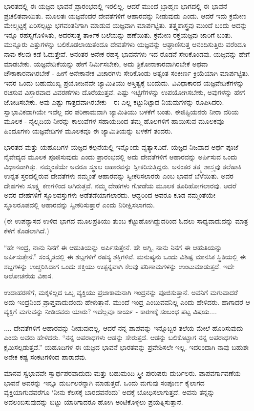 ಭಾರತದಲ್ಲಿ ಈ ಯಜ್ಞದ ಭಾವನೆ ಪ್ರಾರಂಭದಲ್ಲಿ ಇರಲಿಲ್ಲ. ಆದರೆ ಮುಂದೆ ಬ್ರಾಹ್ಮಣ ಭಾಗದಲ್ಲಿ ಈ ಭಾವನೆ ಪ್ರಚಲಿತವಾಯಿತು. ಮೂಲತಃ ಯಜ್ಞವೆಂದರೆ ದೇವತೆಗಳಿಗೆ ಆಹಾರವನ್ನು ನೀಡುವುದು ಎಂದು. ಆದರೆ ಇದು ಕ್ರಮೇಣ ಮೇಲ್ಮಟ್ಟಕ್ಕೆ ಏರಿಸಲ್ಪಟ್ಟು ಭಗವಂತನಿಗಾಗಿ ಮಾಡುವ ಯಜ್ಞವಾಗಿ ಮಾರ್ಪಟ್ಟಿತು. ತತ್ತ್ವಶಾಸ್ತ್ರವು ಮುಂದೆ ಬಂದು ಅದನ್ನು ಇನ್ನೂ ರಹಸ್ಯಗೊಳಿಸಿತು, ಅದರಸುತ್ತ ತಾರ್ಕಿಕ ಬಲೆಯನ್ನು ಹಣೆಯಿತು. ಕ್ರಮೇಣ ರಕ್ತಯಜ್ಞವು ಜಾರಿಗೆ ಬಂತು. ಮುನ್ನೂರು ಎತ್ತುಗಳನ್ನು ಬಲಿಕೊಡಲಾಯಿತೆಂದೂ ದೇವತೆಗಳು ಯಜ್ಞವನ್ನು ಆಘ್ರಾಣಿಸುತ್ತ ಆನಂದಿಸುತ್ತಿರು ವರೆಂದೂ ನಾವು ಕೆಲವು ಕಡೆ ಓದುತ್ತೇವೆ. ಅನಂತರ ಅನೇಕ ರಹಸ್ಯ ಭಾವನೆಗಳು ಇದ ರೊಡನೆ ಸೇರಿಕೊಂಡವು. ಯಜ್ಞವನ್ನು ಹೇಗೆ ಮಾಡಬೇಕು. ಯಜ್ಞವೇದಿಕೆಯನ್ನು ಹೇಗೆ ನಿರ್ಮಿಸಬೇಕು, ಅದು ತ್ರಿಕೋನಾಕಾರವಾಗಿರಬೇಕೆ ಅಥವಾ ಚೌಕಾಕಾರನಾಗಿರಬೇಕೆ - ಹೀಗೆ ಅನೇಕಾನೇಕ ವಿಚಾರಗಳು ಸೇರಿಕೊಂಡು ಅತ್ಯಂತ ಸಂಕೀರ್ಣ ಕ್ರಿಯೆಯಾಗಿ ಮಾರ್ಪಟ್ಟಿತು. ಇದರ ಒಂದು ಬಹುಮುಖ್ಯ ಪ್ರಯೋಜನವೇ ಜ್ಯಾಮಿತಿಯು ಅಸ್ತಿತ್ವಕ್ಕೆ ಬಂದುದು. ವಿವಿಧಾಕಾರದ ಯಜ್ಞವೇದಿಕೆಗಳನ್ನು ರಚಿಸುವ ವಿಸ್ತಾರವಾದ ವಿವರಣೆಗಳು ದೊರೆಯುತ್ತವೆ. ಎಷ್ಟು ಇಟ್ಟಿಗೆಗಳನ್ನು ಉಪಯೋಗಿಸಬೇಕು, ಅವುಗಳನ್ನು ಹೇಗೆ ಜೋಡಿಸಬೇಕು. ಅವು ಎಷ್ಟು ಗಾತ್ರದವಾಗಿರಬೇಕು - ಈ ಎಲ್ಲ ಕಟ್ಟುನಿಟ್ಟಾದ ನಿಯಮಗಳನ್ನು ರೂಪಿಸಿದರು. ಸ್ವಾಭಾವಿಕವಾಗಿಯೇ ಇವೆಲ್ಲ ದರ ಪರಿಣಾಮವಾಗಿ ಜ್ಯಾಮಿತಿಯು ಬಳಕೆಗೆ ಬಂತು. ಈಜಿಪ್ಟಿಯನರು ನೀರಾ ವರಿಯ ಮೂಲಕ - ನೈಲ್ನದಿಯ ನೀರನ್ನು ಕಾಲುವೆಗಳ ಸಹಾಯದಿಂದ ತಮ್ಮ ಹೊಲಗಳಿಗೆ ಹಾಯಿಸುವ ಮೂಲಕವೂ ಹಿಂದೂಗಳು ಯಜ್ಞವೇದಿಗಳ ಮೂಲಕವೂ ಈ ಜ್ಯಾಮಿತಿಯನ್ನು ಬಳಕೆಗೆ ತಂದರು.

ಭಾರತದ ಮತ್ತು ಯಹೂದಿಗಳ ಯಜ್ಞದ ಕಲ್ಪನೆಯಲ್ಲಿ ಇನ್ನೊಂದು ವ್ಯತ್ಯಾಸವಿದೆ. ಯಜ್ಞದ ನಿಜವಾದ ಅರ್ಥ ಪೂಜೆ - ನೈವೇದ್ಯದ ಮೂಲಕ ಪೂಜಿಸುವುದು ಎಂದು ಪ್ರಾರಂಭದಲ್ಲಿ ಅದು ದೇವತೆಗಳಿಗೆ ಆಹಾರವನ್ನು ಅರ್ಪಿಸುವ ಒಂದು ವಿಧಾನವಾಗಿತ್ತು. ನಮ್ಮಂತೆಯೇ ಅವರೂ ಸ್ಥೂಲ ಆಹಾರವನ್ನು ಸ್ವೀಕರಿಸುತ್ತಿದ್ದರು. ಅನಂತರ ತತ್ತ್ವ ಶಾಸ್ತ್ರವು ತಲೆಹಾಕಿ ಉನ್ನತ ಸ್ತರದಲ್ಲಿರುವ ದೇವತೆಗಳು ನಮ್ಮಂತೆ ಆಹಾರವನ್ನು ಸ್ವೀಕರಿಸಲಾರರು ಎಂಬ ಭಾವನೆ ಬೆಳೆಯಿತು. ಅವರ ದೇಹಗಳು ಸೂಕ್ಷ್ಮ ಕಣಗಳಿಂದ ಆಗಿರುತ್ತವೆ. ನಮ್ಮ ದೇಹಗಳು ಗೋಡೆಯ ಮೂಲಕ ತೂರಿಹೋಗಲಾರವು. ಆದರೆ ಅವರ ದೇಹಗಳಿಗೆ ಸ್ಥೂಲವಸ್ತುಗಳು ಅಡೆತಡೆಯಾಗಲಾರದು. ಆದ್ದರಿಂದ ಅವರೂ ಕೂಡ ನಮ್ಮಂತೆಯೇ ಸ್ಥೂಲರೂಪದಲ್ಲಿ ಆಹಾರವನ್ನು ಸ್ವೀಕರಿಸುತ್ತಾರೆ ಎಂದು ನಿರೀಕ್ಷಿಸಲಾಗದು.

(ಈ ಉಪನ್ಯಾಸದ ಉಳಿದ ಭಾಗದ ಮೂಲಪ್ರತಿಯು ತುಂಬ ಕೆಟ್ಟುಹೋಗಿದ್ದುದರಿಂದ ಓದಲು ಸಾಧ್ಯವಾದುದನ್ನು ಮಾತ್ರ ಕೆಳಗೆ ಕೊಡಲಾಗಿದೆ.)

“ಹೇ ಇಂದ್ರ, ನಾನು ನಿನಗೆ ಈ ಆಹುತಿಯನ್ನು ಅರ್ಪಿಸುತ್ತೇನೆ. ಹೇ ಅಗ್ನಿ, ನಾನು ನಿನಗೆ ಈ ಆಹುತಿಯನ್ನು ಅರ್ಪಿಸುತ್ತೇನೆ.” ಸಂಸ್ಕೃತದಲ್ಲಿ ಈ ಶಬ್ದಗಳಿಗೆ ರಹಸ್ಯ ಶಕ್ತಿಗಳಿವೆ. ಮನುಷ್ಯನು ಒಂದು ವಿಶಿಷ್ಟ ಮಾನಸಿಕ ಸ್ಥಿತಿಯಲ್ಲಿ ಈ ಶಬ್ದಗಳನ್ನು ಉಚ್ಚರಿಸಿದಾಗ ಒಂದು ಶಕ್ತಿಯು ಉತ್ಪನ್ನವಾಗಿ ಕೆಲವು ಪರಿಣಾಮಗಳನ್ನು ಉಂಟುಮಾಡುತ್ತದೆ. ಇದೇ ಆಲೋಚನೆಯ ವಿಕಾಸ.

ಉದಾಹರಣೆಗೆ, ಮಕ್ಕಳಿಲ್ಲದ ಒಬ್ಬ ವ್ಯಕ್ತಿಯು ಪ್ರಜಾಕಾಮನಾಗಿ ಇಂದ್ರನನ್ನು ಪೂಜಿಸುತ್ತಾನೆ. ಅವನಿಗೆ ಮಗುವಾದರೆ ಅದು ಇಂದ್ರನಿಂದ ಪ್ರಾಪ್ತವಾದುದೆಂದು ಹೇಳುತ್ತಾನೆ. ಮುಂದೆ ಇಂದ್ರ ಎಂಬುವವನಿಲ್ಲ ಎಂದು ಹೇಳಿದರು. ಹಾಗಾದರೆ ಆ ವ್ಯಕ್ತಿಗೆ ಮಗುವನ್ನು ನೀಡಿದವರು ಯಾರು? ಇದೆಲ್ಲವೂ ಕಾರ್ಯ - ಕಾರಣಕ್ಕೆ ಸಂಬಂಧ ಪಟ್ಟ ವಿಷಯ....

.... ದೇವತೆಗಳಿಗೆ ಆಹಾರವನ್ನು ನೀಡುವುದಲ್ಲ, ಆದರೆ ನನ್ನ ಪಾಪವನ್ನು ಇನ್ನೊಬ್ಬರ ತಲೆಯ ಮೇಲೆ ಹೊರಿಸುವುದು ಎಂದು ಅವರು ಹೇಳಿದರು. “ನನ್ನ ಅಪರಾಧಗಳು ಆಡನ್ನು ಸೇರುತ್ತದೆ. ಆಡನ್ನು ಬಲಿಕೊಟ್ಟಾಗ ನನ್ನ ಅಪರಾಧಗಳು ಕ್ಷಮಿಸಲ್ಪಡುತ್ತವೆ.” ಯಹೂದಿಗಳ ಈ ಯಜ್ಞದ ಭಾವನೆ ಭಾರತವನ್ನು ಪ್ರವೇಶಿಸಲೇ ಇಲ್ಲ. ಇದರಿಂದಾಗಿ ನಾವು ಬಹುಶಃ ಅನೇಕ ಕಷ್ಟ ಸಂಕಟಗಳಿಂದ ಪಾರಾದೆವು.

ಮಾನವ ಸ್ವಭಾವವೇ ಸ್ವಾರ್ಥಪರವಾದುದು ಮತ್ತು ಬಹುಮಂದಿ ಸ್ತ್ರೀ ಪುರುಷರು ದುರ್ಬಲರು. ಪಾಪವರ್ಗಾವಣೆಯ ಭಾವನೆ ಅವರನ್ನು ಇನ್ನೂ ದುರ್ಬಲರನ್ನಾಗಿ ಮಾಡುತ್ತದೆ. ಒಂದು ಮಗುವು ಸಂಪೂರ್ಣ ಕೈಲಾಗದ ವ್ಯಕ್ತಿಯಾಗುವವರೆಗೂ ‘ನೀನು ಕೆಲಸಕ್ಕೆ ಬಾರದವನೆಂದು’ ಅದಕ್ಕೆ ಬೋಧಿಸಲಾಗುತ್ತದೆ. ಅವನು ತನ್ನನ್ನು ಅವಲಂಬಿಸುವುದನ್ನು ಬಿಟ್ಟು ಯಾರಿಗಾದರೂ ಹೋಗಿ ಅಂಟಿಕೊಳ್ಳಲು ಪ್ರಯತ್ನಿಸುತ್ತಾನೆ.

